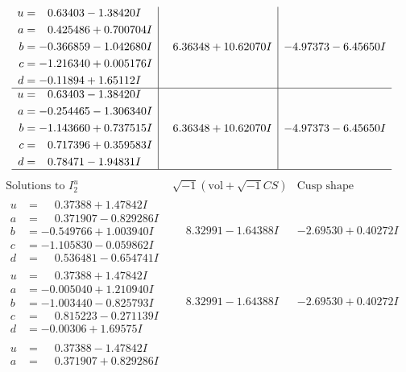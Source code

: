 \documentclass[1p]{elsarticle_modified}
\theoremstyle{definition}
\newcommand{\I}{\sqrt{-1}}
\begin{document}
$$\begin{array}{c|c|c}
\begin{aligned}
u &= \phantom{-}0.63403 - 1.38420 I \\
a &= \phantom{-}0.425486 + 0.700704 I \\
b &= -0.366859 - 1.042680 I \\
c &= -1.216340 + 0.005176 I \\
d &= -0.11894 + 1.65112 I\end{aligned}
 & \phantom{-}6.36348 + 10.62070 I & -4.97373 - 6.45650 I \\ \hline\begin{aligned}
u &= \phantom{-}0.63403 - 1.38420 I \\
a &= -0.254465 - 1.306340 I \\
b &= -1.143660 + 0.737515 I \\
c &= \phantom{-}0.717396 + 0.359583 I \\
d &= \phantom{-}0.78471 - 1.94831 I\end{aligned}
 & \phantom{-}6.36348 + 10.62070 I & -4.97373 - 6.45650 I\\
 \hline 
 \end{array}$$\newpage$$\begin{array}{c|c|c}  
\text{Solutions to }I^u_{2}& \I (\text{vol} + \sqrt{-1}CS) & \text{Cusp shape}\\
 \hline 
\begin{aligned}
u &= \phantom{-}0.37388 + 1.47842 I \\
a &= \phantom{-}0.371907 - 0.829286 I \\
b &= -0.549766 + 1.003940 I \\
c &= -1.105830 - 0.059862 I \\
d &= \phantom{-}0.536481 - 0.654741 I\end{aligned}
 & \phantom{-}8.32991 - 1.64388 I & -2.69530 + 0.40272 I \\ \hline\begin{aligned}
u &= \phantom{-}0.37388 + 1.47842 I \\
a &= -0.005040 + 1.210940 I \\
b &= -1.003440 - 0.825793 I \\
c &= \phantom{-}0.815223 - 0.271139 I \\
d &= -0.00306 + 1.69575 I\end{aligned}
 & \phantom{-}8.32991 - 1.64388 I & -2.69530 + 0.40272 I \\ \hline\begin{aligned}
u &= \phantom{-}0.37388 - 1.47842 I \\
a &= \phantom{-}0.371907 + 0.829286 I \\

\end{aligned}
\end{array}$$
\end{document}
